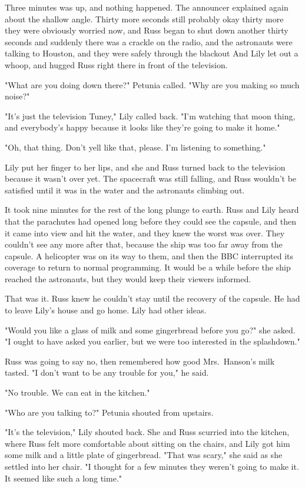 Three minutes was up, and nothing happened. The announcer explained again about the shallow angle. Thirty more seconds{\el} still probably okay{\el} thirty more{\el} they were obviously worried now, and Russ began to shut down{\el} another thirty seconds{\el} and suddenly there was a crackle on the radio, and the astronauts were talking to Houston, and they were safely through the blackout{\el} And Lily let out a whoop, and hugged Russ right there in front of the television.

"What are you doing down there?" Petunia called. "Why are you making so much noise?"

"It's just the television Tuney," Lily called back. "I'm watching that moon thing, and everybody's happy because it looks like they're going to make it home."

"Oh, that thing. Don't yell like that, please. I'm listening to something."

Lily put her finger to her lips, and she and Russ turned back to the television because it wasn't over yet. The spacecraft was still falling, and Russ wouldn't be satisfied until it was in the water and the astronauts climbing out.

It took nine minutes for the rest of the long plunge to earth. Russ and Lily heard that the parachutes had opened long before they could see the capsule, and then it came into view and hit the water, and they knew the worst was over. They couldn't see any more after that, because the ship was too far away from the capsule. A helicopter was on its way to them, and then the BBC interrupted its coverage to return to normal programming. It would be a while before the ship reached the astronauts, but they would keep their viewers informed.

That was it. Russ knew he couldn't stay until the recovery of the capsule. He had to leave Lily's house and go home. Lily had other ideas.

"Would you like a glass of milk and some gingerbread before you go?" she asked. "I ought to have asked you earlier, but we were too interested in the splashdown."

Russ was going to say no, then remembered how good Mrs.~Hanson's milk tasted. "I don't want to be any trouble for you," he said.

"No trouble. We can eat in the kitchen."

"Who are you talking to?" Petunia shouted from upstairs.

"It's the television," Lily shouted back. She and Russ scurried into the kitchen, where Russ felt more comfortable about sitting on the chairs, and Lily got him some milk and a little plate of gingerbread. "That was scary," she said as she settled into her chair. "I thought for a few minutes they weren't going to make it. It seemed like such a long time."

